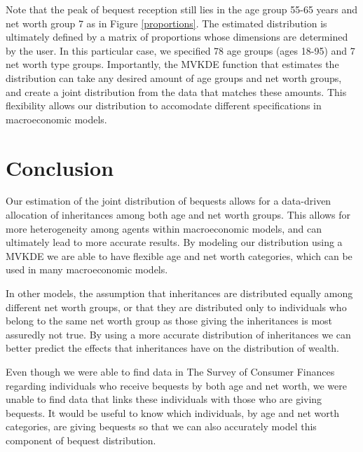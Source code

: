 \documentclass[letterpaper,12pt]{article}
\theoremstyle{definition}
\begin{document}
\begin{spacing}{1.5}
    \newpage Note that the peak of bequest reception still lies in the age group 55-65 years and net worth group 7 as in Figure \ref{proportions}. The estimated distribution is ultimately defined by a matrix of proportions whose dimensions are determined by the user. In this particular case, we specified 78 age groups (ages 18-95) and 7 net worth type groups. Importantly, the MVKDE function that estimates the distribution can take any desired amount of age groups and net worth groups, and create a joint distribution from the data that matches these amounts. This flexibility allows our distribution to accomodate different specifications in macroeconomic models.

    


\section{Conclusion}\label{SecConclusion}

  Our estimation of the joint distribution of bequests allows for a data-driven allocation of inheritances among both age and net worth groups. This allows for more heterogeneity among agents within macroeconomic models, and can ultimately lead to more accurate results. By modeling our distribution using a MVKDE we are able to have flexible age and net worth categories, which can be used in many macroeconomic models.

  In other models, the assumption that inheritances are distributed equally among different net worth groups, or that they are distributed only to individuals who belong to the same net worth group as those giving the inheritances is most assuredly not true. By using a more accurate distribution of inheritances we can better predict the effects that inheritances have on the distribution of wealth.


  Even though we were able to find data in The Survey of Consumer Finances regarding individuals who receive bequests by both age and net worth, we were unable to find data that links these individuals with those who are giving bequests. It would be useful to know which individuals, by age and net worth categories, are giving bequests so that we can also accurately model this component of bequest distribution.



\clearpage


\end{spacing}


\newpage

\end{document}
